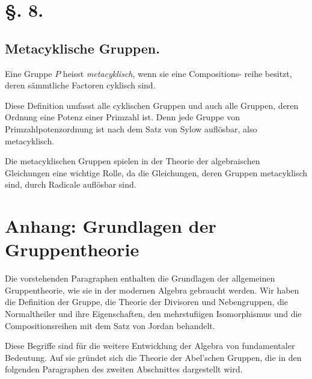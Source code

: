 \documentclass[12pt,a4paper]{article}
\theoremstyle{plain}
\theoremstyle{definition}
\theoremstyle{remark}
\begin{document}
\newpage

\section*{\S. 8.}
\subsection*{Metacyklische Gruppen.}

Eine Gruppe $P$ heisst \emph{metacyklisch}, wenn sie eine Compositions-
reihe besitzt, deren sämmtliche Factoren cyklisch sind.

Diese Definition umfasst alle cyklischen Gruppen und auch
alle Gruppen, deren Ordnung eine Potenz einer Primzahl ist.
Denn jede Gruppe von Primzahlpotenzordnung ist nach dem
Satz von Sylow auflösbar, also metacyklisch.

Die metacyklischen Gruppen spielen in der Theorie der
algebraischen Gleichungen eine wichtige Rolle, da die Gleichungen,
deren Gruppen metacyklisch sind, durch Radicale auflösbar sind.

\newpage

\section*{Anhang: Grundlagen der Gruppentheorie}

Die vorstehenden Paragraphen enthalten die Grundlagen der
allgemeinen Gruppentheorie, wie sie in der modernen Algebra
gebraucht werden. Wir haben die Definition der Gruppe, die
Theorie der Divisoren und Nebengruppen, die Normaltheiler und
ihre Eigenschaften, den mehrstufiigen Isomorphismus und die
Compositionsreihen mit dem Satz von Jordan behandelt.

Diese Begriffe sind für die weitere Entwicklung der Algebra
von fundamentaler Bedeutung. Auf sie gründet sich die Theorie
der Abel'schen Gruppen, die in den folgenden Paragraphen des
zweiten Abschnittes dargestellt wird.
\end{document}
